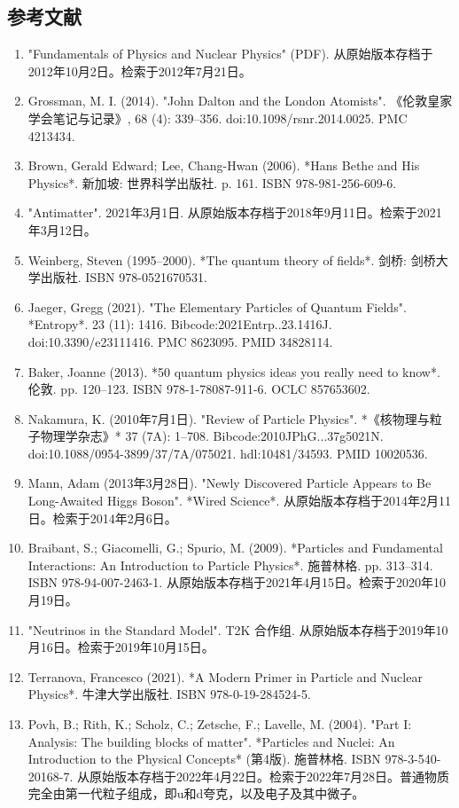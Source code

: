 \subsection{参考文献}
\begin{enumerate}
\item "Fundamentals of Physics and Nuclear Physics" (PDF). 从原始版本存档于2012年10月2日。检索于2012年7月21日。
\item Grossman, M. I. (2014). "John Dalton and the London Atomists". 《伦敦皇家学会笔记与记录》, 68 (4): 339–356. doi:10.1098/rsnr.2014.0025. PMC 4213434.
\item Brown, Gerald Edward; Lee, Chang-Hwan (2006). *Hans Bethe and His Physics*. 新加坡: 世界科学出版社. p. 161. ISBN 978-981-256-609-6.
\item "Antimatter". 2021年3月1日. 从原始版本存档于2018年9月11日。检索于2021年3月12日。
\item Weinberg, Steven (1995–2000). *The quantum theory of fields*. 剑桥: 剑桥大学出版社. ISBN 978-0521670531.
\item Jaeger, Gregg (2021). "The Elementary Particles of Quantum Fields". *Entropy*. 23 (11): 1416. Bibcode:2021Entrp..23.1416J. doi:10.3390/e23111416. PMC 8623095. PMID 34828114.
\item Baker, Joanne (2013). *50 quantum physics ideas you really need to know*. 伦敦. pp. 120–123. ISBN 978-1-78087-911-6. OCLC 857653602.
\item Nakamura, K. (2010年7月1日). "Review of Particle Physics". *《核物理与粒子物理学杂志》* 37 (7A): 1–708. Bibcode:2010JPhG...37g5021N. doi:10.1088/0954-3899/37/7A/075021. hdl:10481/34593. PMID 10020536.
\item Mann, Adam (2013年3月28日). "Newly Discovered Particle Appears to Be Long-Awaited Higgs Boson". *Wired Science*. 从原始版本存档于2014年2月11日。检索于2014年2月6日。
\item Braibant, S.; Giacomelli, G.; Spurio, M. (2009). *Particles and Fundamental Interactions: An Introduction to Particle Physics*. 施普林格. pp. 313–314. ISBN 978-94-007-2463-1. 从原始版本存档于2021年4月15日。检索于2020年10月19日。
\item "Neutrinos in the Standard Model". T2K 合作组. 从原始版本存档于2019年10月16日。检索于2019年10月15日。
\item Terranova, Francesco (2021). *A Modern Primer in Particle and Nuclear Physics*. 牛津大学出版社. ISBN 978-0-19-284524-5.
\item Povh, B.; Rith, K.; Scholz, C.; Zetsche, F.; Lavelle, M. (2004). "Part I: Analysis: The building blocks of matter". *Particles and Nuclei: An Introduction to the Physical Concepts* (第4版). 施普林格. ISBN 978-3-540-20168-7. 从原始版本存档于2022年4月22日。检索于2022年7月28日。普通物质完全由第一代粒子组成，即u和d夸克，以及电子及其中微子。

\end{enumerate}
